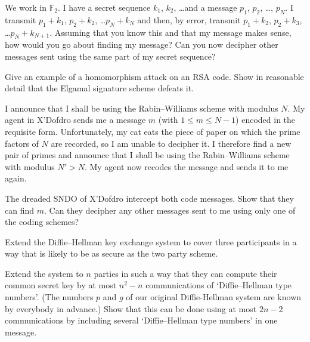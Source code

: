\begin{question}\label{C4.7}
We work in ${\mathbb F}_{2}$.
I have a secret sequence $k_{1}$, $k_{2}$, \dots  and a
message $p_{1}$, $p_{2}$, \dots, $p_{N}$. I transmit
$p_{1}+k_{1}$, $p_{2}+k_{2}$, \dots $p_{N}+k_{N}$
and then, by error, transmit
$p_{1}+k_{2}$, $p_{2}+k_{3}$, \dots $p_{N}+k_{N+1}$.
Assuming that you know this and that my
message makes sense, how would you go about
finding my message? Can you now decipher
other messages sent using the same
part of my secret sequence?
\end{question}
\begin{question}\label{C4.8}
Give an example of a homomorphism attack
on an RSA code. Show in reasonable
detail that the Elgamal
signature scheme defeats it.
\end{question}
\begin{question}\label{C4.9}
I announce that I shall
be using the Rabin--Williams scheme with
modulus $N$. My agent in X'Dofdro sends
me a message $m$ (with $1\leq m\leq N-1$)
encoded in the requisite form.
Unfortunately, my cat eats the piece of paper
on which the prime factors of $N$ are
recorded, so I am unable to decipher it.
I therefore find a new pair of primes
and announce that I shall
be using the Rabin--Williams scheme with
modulus $N'>N$. My agent now recodes
the message and sends it to me again.

The dreaded SNDO of X'Dofdro intercept
both code messages. Show that they
can find $m$. Can they decipher any
other messages sent to me using only
one of the coding schemes?
\end{question}
\begin{question}\label{C4.10}
Extend the Diffie--Hellman key exchange system
to cover three participants in a way that is
likely to be as secure as the two party scheme.

Extend the system to $n$ parties in such a way that
they can compute their common secret key by at 
most $n^{2}-n$ communications of `Diffie--Hellman type numbers'. 
(The numbers $p$
and $g$ of our original Diffie-Hellman system are
known by everybody in advance.) Show that this can be done using 
at most $2n-2$ communications by including several
`Diffie--Hellman type numbers' in one message.
\end{question}
 
